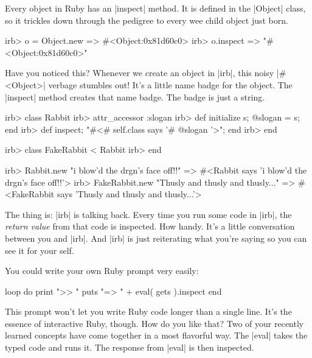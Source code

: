 \documentclass[12pt,twoside]{report}
\begin{document}
Every object in Ruby has an \rubyinline|inspect|
method.  It is defined in the \rubyinline|Object|
class, so it trickles down through the pedigree to every wee child
object just born.


\begin{consolecode}

 irb> o = Object.new
   => #<Object:0x81d60c0>
 irb> o.inspect
   => "#<Object:0x81d60c0>"

\end{consolecode}


Have you noticed this?  Whenever we create an object in
\rubyinline|irb|, this noisy
\rubyinline|#<Object>| verbage stumbles out!  It's a
little name badge for the object.  The
\rubyinline|inspect| method creates that name badge.
The badge is just a string.


\begin{consolecode}

 irb> class Rabbit
 irb>   attr_accessor :slogan
 irb>   def initialize s; @slogan = s; end
 irb>   def inspect; "#<#{ self.class } says '#{ @slogan }'>"; end
 irb> end

 irb> class FakeRabbit < Rabbit
 irb> end

 irb> Rabbit.new "i blow'd the drgn's face off!!"
   => #<Rabbit says 'i blow'd the drgn's face off!!'>
 irb> FakeRabbit.new "Thusly and thusly and thusly..."
   => #<FakeRabbit says 'Thusly and thusly and thusly...'>

\end{consolecode}


The thing is: \rubyinline|irb| is talking back.  Every
time you run some code in \rubyinline|irb|, the {\em
  return value} from that code is inspected.  How handy.  It's a
little conversation between you and \rubyinline|irb|.
And \rubyinline|irb| is just reiterating what you're
saying so you can see it for your self.

You could write your own Ruby prompt very easily:


\begin{rubycode}

 loop do
   print ">> "
   puts  "=> " + eval( gets ).inspect
 end

\end{rubycode}


This prompt won't let you write Ruby code longer than a single line.
It's the essence of interactive Ruby, though.  How do you like that?
Two of your recently learned concepts have come together in a most
flavorful way.  The \rubyinline|eval| takes the typed
code and runs it. The response from \rubyinline|eval|
is then inspected.
\end{document}

